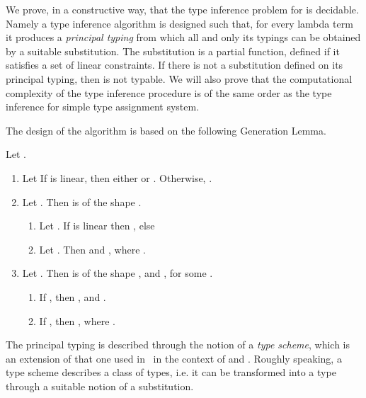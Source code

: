We prove, in a constructive way, that the type inference problem for
\ETAS{} is decidable. Namely a type inference algorithm is
designed such that, for every lambda term  it produces
a \emph{principal typing} from which all and only its typings can be
obtained by a suitable substitution. The substitution is a partial
function, defined if it satisfies a set of linear constraints.  If
there is not a substitution defined on its principal typing, then 
is not typable.  We will also prove that the computational complexity
of the type inference procedure is of the same order as the type
inference for simple type assignment system.

The design of the algorithm is based on the following Generation Lemma.
\begin{lem} 
Let .
 \begin{enumerate}[\em i)]
\item Let  If  is linear, then either  or . 
Otherwise, .
\item Let . Then  is of the shape .
\begin{enumerate}[]
\item Let . If  is linear then , else
 
\item Let . Then  and
, where 
.   
\end{enumerate}
\item Let . Then  is of the shape ,
 and  
, for some .
\begin{enumerate}[\em(a)]
\item If , then ,  and .
\item If , then , where
.      
\end{enumerate}
 \end{enumerate}
 \end{lem}  
\noindent The principal typing is described through the notion of a
 \emph{type scheme}, which is an extension of that one used in~\cite{Coppola03tlca} in
 the context of  and \NEAL.  Roughly speaking, a type scheme
 describes a class of types, i.e.  it can be transformed into a type
 through a suitable notion of a substitution.

